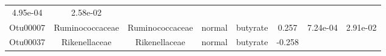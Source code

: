 \documentclass[11pt,]{article}
\begin{document}
\begin{longtable}[]{@{}cccccccc@{}}
\begin{minipage}[t]{0.08\columnwidth}
4.95e-04\strut
\end{minipage} & \begin{minipage}[t]{0.08\columnwidth}\centering\strut
2.58e-02\strut
\end{minipage}\tabularnewline
\begin{minipage}[t]{0.08\columnwidth}\centering\strut
Otu00007\strut
\end{minipage} & \begin{minipage}[t]{0.15\columnwidth}\centering\strut
Ruminococcaceae\strut
\end{minipage} & \begin{minipage}[t]{0.15\columnwidth}\centering\strut
Ruminococcaceae\strut
\end{minipage} & \begin{minipage}[t]{0.08\columnwidth}\centering\strut
normal\strut
\end{minipage} & \begin{minipage}[t]{0.09\columnwidth}\centering\strut
butyrate\strut
\end{minipage} & \begin{minipage}[t]{0.07\columnwidth}\centering\strut
0.257\strut
\end{minipage} & \begin{minipage}[t]{0.08\columnwidth}\centering\strut
7.24e-04\strut
\end{minipage} & \begin{minipage}[t]{0.08\columnwidth}\centering\strut
2.91e-02\strut
\end{minipage}\tabularnewline
\begin{minipage}[t]{0.08\columnwidth}\centering\strut
Otu00037\strut
\end{minipage} & \begin{minipage}[t]{0.15\columnwidth}\centering\strut
Rikenellaceae\strut
\end{minipage} & \begin{minipage}[t]{0.15\columnwidth}\centering\strut
Rikenellaceae\strut
\end{minipage} & \begin{minipage}[t]{0.08\columnwidth}\centering\strut
normal\strut
\end{minipage} & \begin{minipage}[t]{0.09\columnwidth}\centering\strut
butyrate\strut
\end{minipage} & \begin{minipage}[t]{0.07\columnwidth}\centering\strut
-0.258\strut
\end{minipage} & \begin{minipage}[t]{0.08\columnwidth}\centering\strut

\end{minipage}
\end{longtable}
\end{document}
